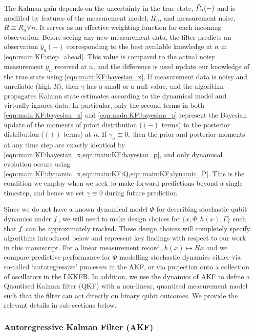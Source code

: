 \documentclass[pra, reprint]{revtex4-1}
\begin{document}
The Kalman gain depends on the uncertainty in the true state, $\hat{P}_{n}(-)$ and is modified by features of the measurement model, $H_n$, and measurement noise, $R\equiv R_n \forall n$. It serves as an effective weighting function for each incoming observation.  Before seeing any new measurement data, the filter predicts an observation $\hat{y}_n(-)$ corresponding to the best available knowledge at $n$ in \cref{eqn:main:KF:step_ahead}. This value is compared to the actual noisy measurement $y_n$ received at $n$, and the difference is used update our knowledge of the true state using \cref{eqn:main:KF:bayesian_x}. If measurement data is noisy and unreliable (high $R$), then $\gamma$ has a small or a null value, and the algorithm propagates Kalman state estimates according to the dynamical model and virtually ignores data. In particular, only the second terms in both \cref{eqn:main:KF:bayesian_x} and \cref{eqn:main:KF:bayesian_p} represent the Bayesian update of the moments of priori distribution ($(-)$ terms) to the posterior distribution ($(+)$ terms) at $n$. If $\gamma_n \equiv 0$, then the prior and posterior moments at any time step are exactly identical by \cref{eqn:main:KF:bayesian_x,eqn:main:KF:bayesian_p}, and only dynamical evolution occurs using \cref{eqn:main:KF:dynamic_x,eqn:main:KF:Q,eqn:main:KF:dynamic_P}.  This is the condition we employ when we seek to make forward predictions beyond a single timestep, and hence we set $\gamma \equiv 0$ during future prediction.

Since we do not have a known dynamical model $\Phi$ for describing stochastic qubit dynamics under $f$, we will need to make design choices for  $\{ x, \Phi, h(x), \Gamma \}$  such that $f$ can be approximately tracked. These design choices will completely specify algorithms introduced below and represent key findings with respect to our work in this manuscript. For a linear measurement record, $h(x) \mapsto Hx$ and we compare predictive performance for $\Phi$ modelling stochastic dynamics either via so-called `autoregressive' processes in the AKF, or via projection onto a collection of oscillators in the LKKFB.  In addition, we use the dynamics of AKF to define a Quantised Kalman filter (QKF) with a non-linear, quantised measurement model such that the filter can act directly on binary qubit outcomes. We provide the relevant details in sub-sections below. 
 


\subsubsection{Autoregressive Kalman Filter (AKF)}
\end{document}
